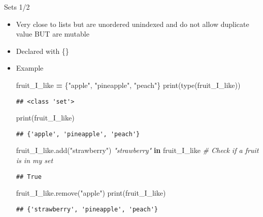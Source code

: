 \documentclass[
  8pt,
  ignorenonframetext,
]{beamer}
\newenvironment{Shaded}{\begin{snugshade}}{\end{snugshade}}
\newcommand{\BuiltInTok}[1]{#1}
\newcommand{\CommentTok}[1]{\textcolor[rgb]{0.56,0.35,0.01}{\textit{#1}}}
\newcommand{\KeywordTok}[1]{\textcolor[rgb]{0.13,0.29,0.53}{\textbf{#1}}}
\newcommand{\NormalTok}[1]{#1}
\newcommand{\OperatorTok}[1]{\textcolor[rgb]{0.81,0.36,0.00}{\textbf{#1}}}
\newcommand{\StringTok}[1]{\textcolor[rgb]{0.31,0.60,0.02}{#1}}
\providecommand{\tightlist}{%
  \setlength{\itemsep}{0pt}\setlength{\parskip}{0pt}}
\begin{document}
\begin{frame}[fragile]{Sets 1/2}
\protect\hypertarget{sets-12}{}
\begin{itemize}[<+->]
\tightlist
\item
  Very close to lists but are unordered unindexed and do not allow
  duplicate value BUT are mutable
\end{itemize}

\begin{itemize}[<+->]
\tightlist
\item
  Declared with \{\}
\end{itemize}

\begin{itemize}[<+->]
\item
  Example

\begin{Shaded}
\begin{Highlighting}[]
\NormalTok{fruit\_I\_like }\OperatorTok{=}\NormalTok{ \{}\StringTok{"apple"}\NormalTok{, }\StringTok{"pineapple"}\NormalTok{, }\StringTok{"peach"}\NormalTok{\}}
\BuiltInTok{print}\NormalTok{(}\BuiltInTok{type}\NormalTok{(fruit\_I\_like))}
\end{Highlighting}
\end{Shaded}

\begin{verbatim}
## <class 'set'>
\end{verbatim}

\begin{Shaded}
\begin{Highlighting}[]
\BuiltInTok{print}\NormalTok{(fruit\_I\_like)}
\end{Highlighting}
\end{Shaded}

\begin{verbatim}
## {'apple', 'pineapple', 'peach'}
\end{verbatim}

\begin{Shaded}
\begin{Highlighting}[]
\NormalTok{fruit\_I\_like.add(}\StringTok{"strawberry"}\NormalTok{)}
\CommentTok{"strawberry"} \KeywordTok{in}\NormalTok{ fruit\_I\_like }\CommentTok{\# Check if a fruit is in my set}
\end{Highlighting}
\end{Shaded}

\begin{verbatim}
## True
\end{verbatim}

\begin{Shaded}
\begin{Highlighting}[]
\NormalTok{fruit\_I\_like.remove(}\StringTok{"apple"}\NormalTok{)}
\BuiltInTok{print}\NormalTok{(fruit\_I\_like)}
\end{Highlighting}
\end{Shaded}

\begin{verbatim}
## {'strawberry', 'pineapple', 'peach'}
\end{verbatim}
\end{itemize}
\end{frame}
\end{document}
